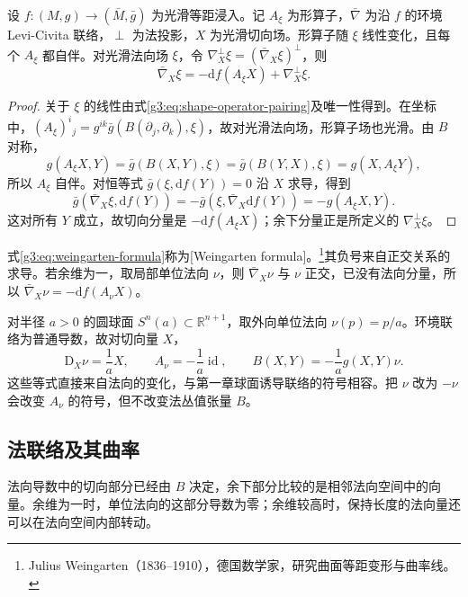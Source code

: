 \begin{proposition}\label{g3:prop:weingarten-decomposition}
	设 \(f:(M,g)\to(\bar M,\bar g)\) 为光滑等距浸入。记 \(A_\xi\) 为形算子，\(\bar\nabla\) 为沿 \(f\) 的环境 Levi-Civita 联络，\(\perp\) 为法投影，\(X\) 为光滑切向场。形算子随 \(\xi\) 线性变化，且每个 \(A_\xi\) 都自伴。对光滑法向场 \(\xi\)，令
	\(\nabla^\perp_X\xi=(\bar\nabla_X\xi)^\perp\)，则
	\begin{equation}\label{g3:eq:weingarten-formula}
		\bar\nabla_X\xi=-\mathrm df(A_\xi X)+\nabla^\perp_X\xi.
	\end{equation}
\end{proposition}
\begin{proof}
	关于 \(\xi\) 的线性由式\eqref{g3:eq:shape-operator-pairing}及唯一性得到。在坐标中，\((A_\xi)^i{}_j=g^{ik}\bar g(B(\partial_j,\partial_k),\xi)\)，故对光滑法向场，形算子场也光滑。由 \(B\) 对称，
	\[
		g(A_\xi X,Y)=\bar g(B(X,Y),\xi)
		=\bar g(B(Y,X),\xi)=g(X,A_\xi Y),
	\]
	所以 \(A_\xi\) 自伴。对恒等式 \(\bar g(\xi,\mathrm df(Y))=0\) 沿 \(X\) 求导，得到
	\[
		\bar g(\bar\nabla_X\xi,\mathrm df(Y))
		=-\bar g(\xi,\bar\nabla_X\mathrm df(Y))
		=-g(A_\xi X,Y).
	\]
	这对所有 \(Y\) 成立，故切向分量是 \(-\mathrm df(A_\xi X)\)；余下分量正是所定义的 \(\nabla^\perp_X\xi\)。
\end{proof}

式\eqref{g3:eq:weingarten-formula}称为[Weingarten formula]。\footnote{Julius Weingarten（1836--1910），德国数学家，研究曲面等距变形与曲率线。}其负号来自正交关系的求导。若余维为一，取局部单位法向 \(\nu\)，则 \(\bar\nabla_X\nu\) 与 \(\nu\) 正交，已没有法向分量，所以 \(\bar\nabla_X\nu=-\mathrm df(A_\nu X)\)。

\begin{example}\label{g3:exm:sphere-extrinsic-sign}
	对半径 \(a>0\) 的圆球面 \(S^n(a)\subset\mathbb R^{n+1}\)，取外向单位法向 \(\nu(p)=p/a\)。环境联络为普通导数，故对切向量 \(X\)，
	\[
		\mathrm D_X\nu=\frac1aX,\qquad
		A_\nu=-\frac1a\operatorname{id},\qquad
		B(X,Y)=-\frac1a g(X,Y)\nu.
	\]
	这些等式直接来自法向的变化，与第一章球面诱导联络的符号相容。把 \(\nu\) 改为 \(-\nu\) 会改变 \(A_\nu\) 的符号，但不改变法丛值张量 \(B\)。
\end{example}

\subsection{法联络及其曲率}
\label{g3:subsec:0401:02}

法向导数中的切向部分已经由 \(B\) 决定，余下部分比较的是相邻法向空间中的向量。余维为一时，单位法向的这部分导数为零；余维较高时，保持长度的法向量还可以在法向空间内部转动。

